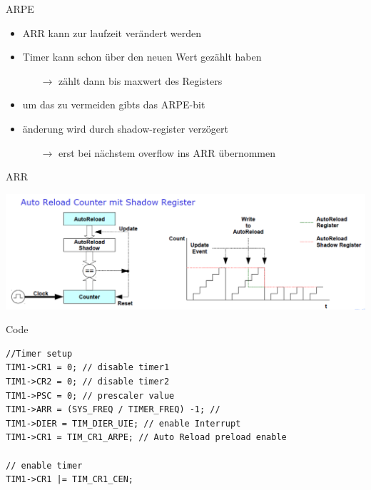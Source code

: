 \documentclass[aspectratio=169,presentation]{beamer}
\begin{document}
\begin{frame}{ARPE}
  \begin{itemize}
    \item ARR kann zur laufzeit verändert werden
    \item Timer kann schon über den neuen Wert gezählt haben
    \begin{itemize}
      \item[$\rightarrow$] zählt dann bis maxwert des Registers
    \end{itemize}
    \item um das zu vermeiden gibts das ARPE-bit
    \item änderung wird durch shadow-register verzögert
    \begin{itemize}
      \item[$\rightarrow$] erst bei nächstem overflow ins ARR übernommen
    \end{itemize}
  \end{itemize}
\end{frame}

\begin{frame}{ARR}
  \begin{center}
    \includegraphics[width=\textwidth]{ARPE_enable}    
  \end{center}
\end{frame}

\begin{frame}[fragile]{Code}
  \begin{lstlisting}
//Timer setup
TIM1->CR1 = 0; // disable timer1
TIM1->CR2 = 0; // disable timer2
TIM1->PSC = 0; // prescaler value
TIM1->ARR = (SYS_FREQ / TIMER_FREQ) -1; // 
TIM1->DIER = TIM_DIER_UIE; // enable Interrupt
TIM1->CR1 = TIM_CR1_ARPE; // Auto Reload preload enable

// enable timer
TIM1->CR1 |= TIM_CR1_CEN;
  \end{lstlisting}
\end{frame}
\end{document}
